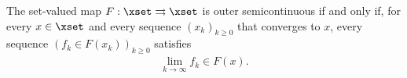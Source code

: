 
\begin{definition}
    The set-valued map $F: \xset \rightrightarrows \xset$ is outer semicontinuous 
    if and only if,
    for every $x \in \xset$ and every sequence $(x_k)_{k \geq 0}$ that converges to $x$,
    every sequence $(f_k \in F(x_k))_{k \geq 0}$ satisfies
    \begin{align*}
        \lim_{k \to \infty} f_k \in F(x) .
    \end{align*}
    
    
\end{definition}